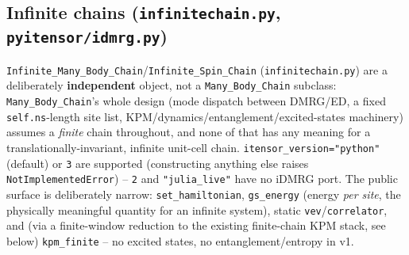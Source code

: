 \documentclass[11pt]{article}
\begin{document}
\subsection{Infinite chains (\texttt{infinitechain.py}, \texttt{pyitensor/idmrg.py})}

\texttt{Infinite\_Many\_Body\_Chain}/\texttt{Infinite\_Spin\_Chain}
(\texttt{infinitechain.py}) are a deliberately \textbf{independent}
object, not a \texttt{Many\_Body\_Chain} subclass:
\texttt{Many\_Body\_Chain}'s whole design (mode dispatch between
DMRG/ED, a fixed \texttt{self.ns}-length site list,
KPM/dynamics/entanglement/excited-states machinery) assumes a
\emph{finite} chain throughout, and none of that has any meaning for a
translationally-invariant, infinite unit-cell chain.
\texttt{itensor\_version="python"} (default) or \texttt{3} are supported
(constructing anything else raises \texttt{NotImplementedError}) --
\texttt{2} and \texttt{"julia\_live"} have no iDMRG port. The public
surface is deliberately narrow: \texttt{set\_hamiltonian},
\texttt{gs\_energy} (energy \emph{per site}, the physically meaningful
quantity for an infinite system), static \texttt{vev}/\texttt{correlator},
and (via a finite-window reduction to the existing finite-chain KPM
stack, see below) \texttt{kpm\_finite} -- no excited
states, no entanglement/entropy in v1.
\end{document}
